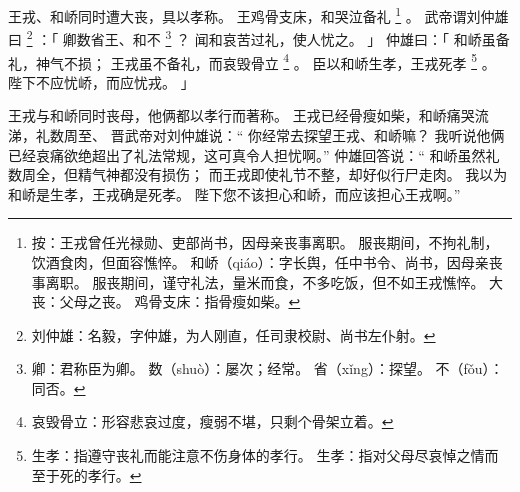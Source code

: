 
\switchcolumn*[\section{}]

王戎、和峤同时遭大丧，具以孝称。
王鸡骨支床，和哭泣备礼%
\footnote{%
    按：王戎曾任光禄勋、吏部尚书，因母亲丧事离职。
        服丧期间，不拘礼制，饮酒食肉，但面容憔悴。
    和峤（qiáo）：字长舆，任中书令、尚书，因母亲丧事离职。
                  服丧期间，谨守礼法，量米而食，不多吃饭，但不如王戎憔悴。
    大丧：父母之丧。
    鸡骨支床：指骨瘦如柴。
}%
。
武帝谓刘仲雄曰%
\footnote{%
    刘仲雄：名毅，字仲雄，为人刚直，任司隶校尉、尚书左仆射。
}%
：「
    卿数省王、和不%
    \footnote{%
        卿：君称臣为卿。
        数（shuò）：屡次；经常。
        省（xǐng）：探望。
        不（fǒu）：同否。
    }%
    ？
    闻和哀苦过礼，使人忧之。
」
仲雄曰：「
    和峤虽备礼，神气不损；
    王戎虽不备礼，而哀毁骨立%
    \footnote{%
        哀毁骨立：形容悲哀过度，瘦弱不堪，只剩个骨架立着。
    }%
    。
    臣以和峤生孝，王戎死孝%
    \footnote{%
        生孝：指遵守丧礼而能注意不伤身体的孝行。
        生孝：指对父母尽哀悼之情而至于死的孝行。
    }%
    。
    陛下不应忧峤，而应忧戎。
」

\switchcolumn


王戎与和峤同时丧母，他俩都以孝行而著称。
王戎已经骨瘦如柴，和峤痛哭流涕，礼数周至、
晋武帝对刘仲雄说：“
 你经常去探望王戎、和峤嘛？
 我听说他俩已经哀痛欲绝超出了礼法常规，这可真令人担忧啊。”
仲雄回答说：“
 和峤虽然礼数周全，但精气神都没有损伤；
 而王戎即使礼节不整，却好似行尸走肉。
 我以为和峤是生孝，王戎确是死孝。
 陛下您不该担心和峤，而应该担心王戎啊。”
